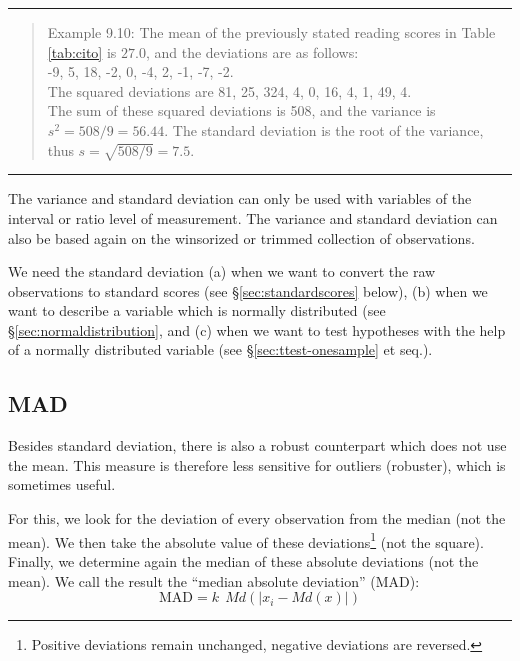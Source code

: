 \documentclass[
]{book}
\begin{document}
\begin{center}\rule{0.5\linewidth}{0.5pt}\end{center}

\begin{quote}
Example 9.10:
The mean of the previously stated reading scores in
Table \ref{tab:cito} is
\(27.0\), and the deviations are as follows:\\
-9, 5, 18, -2, 0, -4, 2, -1, -7, -2.\\
The squared deviations are 81, 25, 324, 4, 0, 16, 4, 1, 49, 4.\\
The sum of these squared deviations is 508, and the variance is
\(s^2=508/9=56.44\). The standard deviation is the root of the
variance, thus \(s=\sqrt{508/9}=7.5\).
\end{quote}

\begin{center}\rule{0.5\linewidth}{0.5pt}\end{center}

The variance and standard deviation can only be used with variables
of the interval or ratio level of measurement. The variance and
standard deviation can also be based again on the winsorized or trimmed
collection of observations.

We need the standard deviation
(a) when we want to convert the raw
observations to standard scores (see §\ref{sec:standardscores} below),
(b) when we want to describe a variable
which is normally distributed (see §\ref{sec:normaldistribution}, and
(c) when we want to test hypotheses with the help of a normally distributed variable (see
§\ref{sec:ttest-onesample} et seq.).

\hypertarget{mad}{%
\subsection{MAD}\label{mad}}

Besides standard deviation, there is also a robust counterpart
which does not use the mean. This measure is therefore less
sensitive for outliers (robuster), which is sometimes useful.

For this, we look for the deviation of every observation from
the median (not the mean). We then take the absolute value
of these deviations\footnote{Positive deviations remain unchanged, negative deviations are reversed.} (not the square). Finally, we
determine again the median of these absolute deviations (not the mean).
We call the result the ``median absolute deviation'' (MAD):
\begin{equation}
  \textrm{MAD} = k ~~ Md ( |x_i - Md(x) |)
  \label{eq:MAD}
\end{equation}
\end{document}
